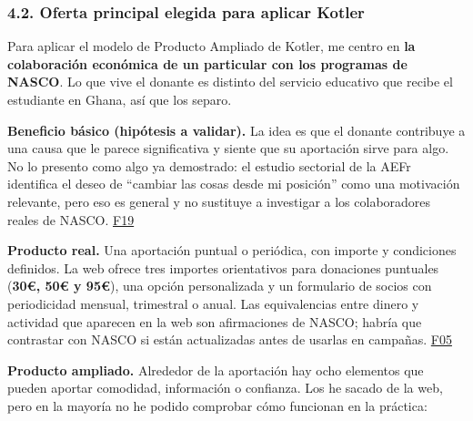 \documentclass[
]{article}
\begin{document}
\hypertarget{oferta-principal-elegida-para-aplicar-kotler}{%
\subsubsection{4.2. Oferta principal elegida para aplicar
Kotler}\label{oferta-principal-elegida-para-aplicar-kotler}}

Para aplicar el modelo de Producto Ampliado de Kotler, me centro en
\textbf{la colaboración económica de un particular con los programas de
NASCO}. Lo que vive el donante es distinto del servicio educativo que
recibe el estudiante en Ghana, así que los separo.

\textbf{Beneficio básico (hipótesis a validar).} La idea es que el
donante contribuye a una causa que le parece significativa y siente que
su aportación sirve para algo. No lo presento como algo ya demostrado:
el estudio sectorial de la AEFr identifica el deseo de ``cambiar las
cosas desde mi posición'' como una motivación relevante, pero eso es
general y no sustituye a investigar a los colaboradores reales de NASCO.
\href{https://www.aefundraising.org/perfil-donante-2024-que-impulsa-a-los-espanoles-a-colaborar/}{F19}

\textbf{Producto real.} Una aportación puntual o periódica, con importe
y condiciones definidos. La web ofrece tres importes orientativos para
donaciones puntuales (\textbf{30€, 50€ y 95€}), una opción personalizada
y un formulario de socios con periodicidad mensual, trimestral o anual.
Las equivalencias entre dinero y actividad que aparecen en la web son
afirmaciones de NASCO; habría que contrastar con NASCO si están
actualizadas antes de usarlas en campañas.
\href{https://nascoict.org/hazte-socio/}{F05}

\textbf{Producto ampliado.} Alrededor de la aportación hay ocho
elementos que pueden aportar comodidad, información o confianza. Los he
sacado de la web, pero en la mayoría no he podido comprobar cómo
funcionan en la práctica:
\end{document}
